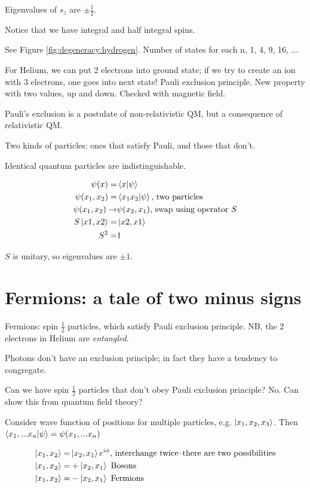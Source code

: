 \documentclass[]{article}
\begin{document}
Eigenvalues of $s_z$ are $\pm \frac{1}{2}$.

Notice that we have integral and half integral spins.

See Figure \ref{fig:degeneracy:hydrogen}. Number of states for each n, 1, 4, 9, 16, ...

For Helium, we can put 2 electrons into ground state; if we try to create an ion with 3 electrons, one goes into next state! Pauli exclusion principle. New property with two values, up and down. Checked with magnetic field.

Pauli's exclusion is a postulate of non-relativistic QM, but a consequence of relativistic QM.

Two kinds of particles: ones that satisfy Pauli, and those that don't.

Identical quantum particles are indistinguishable.

\begin{align*}
\psi(x) =& \braket{x|\psi}\\
\psi(x_1,x_2) =& \braket{x_1x_2|\psi}\text{, two particles}\\
\psi(x_1,x_2) \rightarrow & \psi(x_2,x_1)\text{, swap using operator $S$}\\
S\ket{x1,x2} =& \ket{x2,x1}\\
S^2 =& 1
\end{align*}

$S$ is unitary, so eigenvalues are $\pm1$.

\section{Fermions: a tale of two minus signs}

Fermions: spin $\frac{1}{2}$ particles, which satisfy Pauli exclusion principle. NB, the 2 electrons in Helium are \textit{entangled}.

Photons don't have an exclusion principle; in fact they have a tendency to congregate.
 
Can we have spin $\frac{1}{2}$ particles that don't obey Pauli exclusion principle? No. Can show this from quantum field theory?

Consider wave function of positions for multiple particles, e.g. $\ket{x_1,x_2,x_3}$. Then $\braket{x_1,...x_n|\psi}=\psi(x_1,...x_n)$

\begin{align*}
\ket{x_1, x_2}=&\ket{x_2, x_1}e^{i\phi}\text{, interchange twice--there are two possibilities}\\
\ket{x_1, x_2}=&+\ket{x_2, x_1}\text{ Bosons}\\
\ket{x_1, x_2}=&-\ket{x_2, x_1}\text{ Fermions}
\end{align*}
\end{document}
